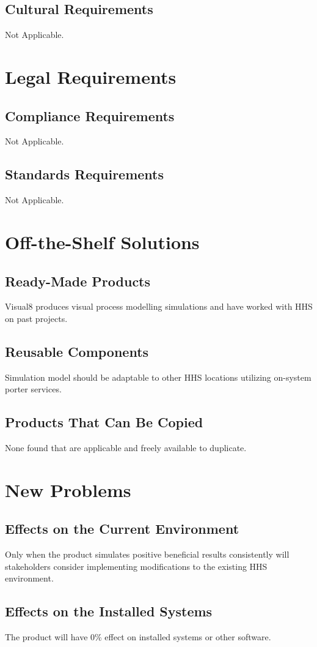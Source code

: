\documentclass[paper=letter, fontsize=10pt]{scrartcl}
\numberwithin{equation}{section}		%
\numberwithin{figure}{section}			%
\numberwithin{table}{section}				%
\begin{document}
\subsection{Cultural Requirements}
Not Applicable.

\section{Legal Requirements}
\subsection{Compliance Requirements}
Not Applicable.
\subsection{Standards Requirements}
Not Applicable.

\section{Off-the-Shelf Solutions}
\subsection{Ready-Made Products}
Visual8 produces visual process modelling simulations and have worked with HHS on past projects.
\subsection{Reusable Components}
Simulation model should be adaptable to other HHS locations utilizing on-system porter services.
\subsection{Products That Can Be Copied}
None found that are applicable and freely available to duplicate.

\section{New Problems}
\subsection{Effects on the Current Environment}
Only when the product simulates positive beneficial results consistently will stakeholders consider implementing modifications to the existing HHS environment.
\subsection{Effects on the Installed Systems}
The product will have 0\% effect on installed systems or other software.
\end{document}

